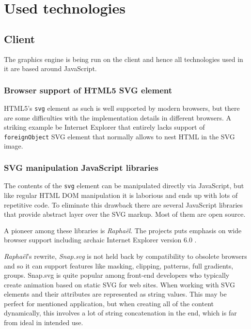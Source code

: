 \documentclass[11pt,oneside, final]{fithesis2}
\begin{document}
\chapter{Used technologies}
\label{tech}

\section{Client}
The graphics engine is being run on the client and hence all technologies used in it are based around JavaScript.

\subsection{Browser support of HTML5 SVG element}
HTML5's \texttt{svg} element as such is well supported by modern browsers\cite{html5svg}, but there are some difficulties with the implementation details in different browsers. A striking example be Internet Explorer that entirely lacks support of \texttt{foreignObject} SVG element that normally allows to nest HTML in the SVG image\cite{ieforeignobject}.

\subsection{SVG manipulation JavaScript libraries}
The contents of the \texttt{svg} element can be manipulated directly via JavaScript, but like regular HTML DOM manipulation it is laborious and ends up with lots of repetitive code. To eliminate this drawback there are several JavaScript libraries that provide abstract layer over the SVG markup. Most of them are open source.

A pioneer among these libraries is \emph{Raphaël}. The projects puts emphasis on wide browser support including archaic Internet Explorer version 6.0 \cite{raphael}.

\emph{Raphaël}'s rewrite, \emph{Snap.svg} is not held back by compatibility to obsolete browsers and so it can support features like masking, clipping, patterns, full gradients, groups\cite{snap}. Snap.svg is quite popular among front-end developers who typically create animation based on static SVG for web sites\cite{snapusage}. When working with SVG elements and their attributes are represented as string values. This may be perfect for mentioned application, but when creating all of the content dynamically, this involves a lot of string concatenation in the end, which is far from ideal in intended use.
\end{document}
